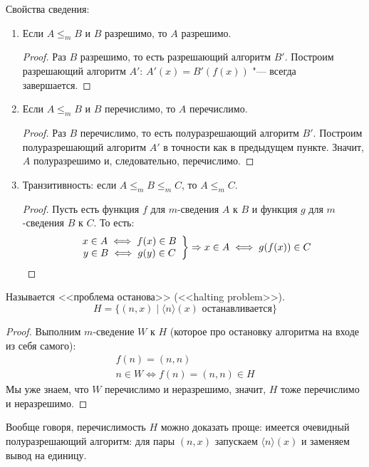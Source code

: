 Свойства сведения:
\begin{enumerate}
	\item Если $A \le_m B$ и $B$ разрешимо, то $A$ разрешимо.
		\begin{proof}
			Раз $B$ разрешимо, то есть разрешающий алгоритм $B'$.
			Построим разрешающий алгоритм $A'$: $A'(x)=B'(f(x))$ "--- всегда завершается.
		\end{proof}
	\item Если $A \le_m B$ и $B$ перечислимо, то $A$ перечислимо.
		\begin{proof}
			Раз $B$ перечислимо, то есть полуразрешающий алгоритм $B'$.
			Построим полуразрешающий алгоритм $A'$ в точности как в предыдущем пункте.
			Значит, $A$ полуразрешимо и, следовательно, перечислимо.
		\end{proof}
	\item Транзитивность: если $A \le_m B \le_m C$, то $A \le_m C$.
		\begin{proof}
			Пусть есть функция $f$ для $m$-сведения $A$ к $B$ и функция $g$ для $m$-сведения $B$ к $C$.
			То есть:
			\[
				\left.
				\begin{array}{c}
					x \in A \iff f(x) \in B \\
					y \in B \iff g(y) \in C
				\end{array}
				\right\}
				\Rightarrow
				x \in A \iff g(f(x)) \in C
			\]
		\end{proof}
\end{enumerate}

\begin{exmp}
	Называется <<проблема останова>> (<<halting problem>>).
	\[ H = \{(n, x) \mid \langle n \rangle(x)\text{~останавливается} \} \]
\end{exmp}
\begin{proof}
	Выполним $m$-сведение $W$ к $H$ (которое про остановку алгоритма на входе из себя самого):
	\begin{gather*}
		f(n) = (n, n) \\
		n \in W \iff f(n) = (n, n) \in H
	\end{gather*}
	Мы уже знаем, что $W$ перечислимо и неразрешимо, значит, $H$ тоже перечислимо и неразрешимо.
\end{proof}
\begin{Rem}
	Вообще говоря, перечислимость $H$ можно доказать проще: имеется очевидный полуразрешающий алгоритм:
	для пары $(n, x)$ запускаем $\langle n \rangle(x)$ и заменяем вывод на единицу.
\end{Rem}

